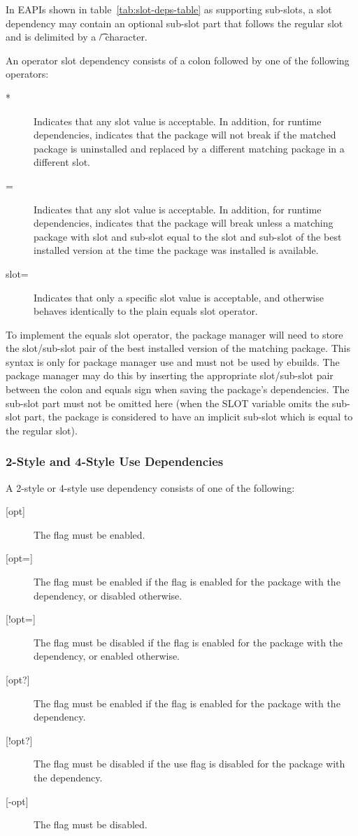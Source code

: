  In EAPIs shown in table~\ref{tab:slot-deps-table} as supporting sub-slots,
a slot dependency may contain an optional sub-slot part that follows the regular slot and is
delimited by a \t{/} character.

 An operator slot dependency consists of a colon followed by one of
the following operators:

\begin{description}
\item[*] Indicates that any slot value is acceptable. In addition, for runtime dependencies,
indicates that the package will not break if the matched package is uninstalled and replaced by
a different matching package in a different slot.
\item[=] Indicates that any slot value is acceptable. In addition, for runtime dependencies,
indicates that the package will break unless a matching package with slot and sub-slot equal to the
slot and sub-slot of the best installed version at the time the package was installed is available.
\item[slot=] Indicates that only a specific slot value is acceptable, and otherwise behaves
identically to the plain equals slot operator.
\end{description}

To implement the equals slot operator, the package manager will need to store the slot/sub-slot
pair of the best installed version of the matching package. This syntax is only for package manager
use and must not be used by ebuilds. The package manager may do this by inserting the appropriate
slot/sub-slot pair between the colon and equals sign when saving the package's dependencies. The
sub-slot part must not be omitted here (when the SLOT variable omits the sub-slot part, the package
is considered to have an implicit sub-slot which is equal to the regular slot).

\subsubsection{2-Style and 4-Style Use Dependencies}
\label{sec:use-dep}

A 2-style or 4-style use dependency consists of one of the following:

\begin{description}
\item[{[opt]}] The flag must be enabled.
\item[{[opt=]}] The flag must be enabled if the flag is enabled for the package with the
    dependency, or disabled otherwise.
\item[{[!opt=]}] The flag must be disabled if the flag is enabled for the package with the
    dependency, or enabled otherwise.
\item[{[opt?]}] The flag must be enabled if the flag is enabled for the package with the
    dependency.
\item[{[!opt?]}] The flag must be disabled if the use flag is disabled for the package with the
    dependency.
\item[{[-opt]}] The flag must be disabled.
\end{description}


